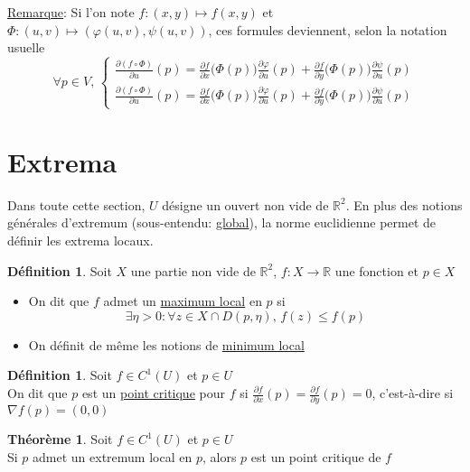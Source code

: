 \documentclass[10pt,a4paper]{article}
\theoremstyle{definition}
\newtheorem{theorem}[proposition]{Théorème}
\newtheorem{definition}[proposition]{Définition}
\begin{document}
\noindent \uline{Remarque}: Si l'on note $f: (x, y) \mapsto f(x, y)$ et $\Phi: (u, v) \mapsto \left(\varphi(u, v), \psi(u, v)\right)$, ces formules deviennent, selon la notation usuelle
\[ \forall p \in V,\, \begin{cases}
\displaystyle
\frac{\partial(f \circ \Phi)}{\partial u}(p) = \frac{\partial f}{\partial x}\big(\Phi(p)\big) \frac{\partial \varphi}{\partial u}(p) + \frac{\partial f}{\partial y}\big(\Phi(p)\big) \frac{\partial \psi}{\partial u}(p) \\
\displaystyle
\frac{\partial(f \circ \Phi)}{\partial u}(p) = \frac{\partial f}{\partial x}\big(\Phi(p)\big) \frac{\partial \varphi}{\partial u}(p) + \frac{\partial f}{\partial y}\big(\Phi(p)\big) \frac{\partial \psi}{\partial u}(p) 
\end{cases} \]

\section{Extrema}
Dans toute cette section, $U$ désigne un ouvert non vide de $\mathbb{R}^2$. En plus des notions générales d'extremum (sous-entendu: \uline{global}), la norme euclidienne permet de définir les extrema locaux.
\begin{definition}
Soit $X$ une partie non vide de $\mathbb{R}^2$, $f: X \to \mathbb{R}$ une fonction et $p \in X$
\begin{itemize}
\item On dit que $f$ admet un \uline{maximum local} en $p$ si
\[ \exists \eta > 0: \forall z \in X \cap D(p, \eta),\, f(z) \leq f(p) \]
\item On définit de même les notions de \uline{minimum local}
\end{itemize}
\end{definition}
\begin{definition}
Soit $f \in C^1(U)$ et $p \in U$ \\
On dit que $p$ est un \uline{point critique} pour $f$ si $\frac{\partial f}{\partial x}(p) = \frac{\partial f}{\partial y}(p) = 0$, c'est-à-dire si $\nabla f(p) = (0, 0)$
\end{definition}
\begin{theorem}
Soit $f \in C^1(U)$ et $p \in U$ \\
Si $p$ admet un extremum local en $p$, alors $p$ est un point critique de $f$
\end{theorem}
\end{document}
